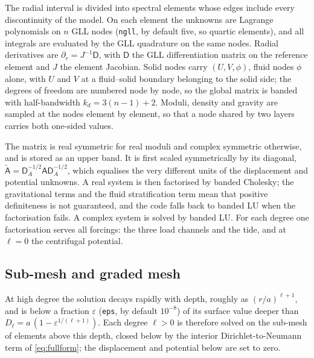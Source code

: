 \documentclass[11pt,a4paper]{article}
\newcommand{\code}[1]{\texttt{#1}}
\numberwithin{equation}{section}
\begin{document}
The radial interval is divided into spectral elements whose edges include every
discontinuity of the model. On each element the unknowns are Lagrange
polynomials on $n$ GLL nodes (\code{ngll}, by default five, so quartic
elements), and all integrals are evaluated by the GLL quadrature on the same
nodes. Radial derivatives are $\partial_{r}=J^{-1}\mathsf{D}$, with
$\mathsf{D}$ the GLL differentiation matrix on the reference element and $J$
the element Jacobian. Solid nodes carry $(U,V,\phi)$, fluid nodes $\phi$ alone,
with $U$ and $V$ at a fluid--solid boundary belonging to the solid side; the
degrees of freedom are numbered node by node, so the global matrix is banded
with half-bandwidth $k_{d}=3(n-1)+2$. Moduli, density and gravity are sampled
at the nodes element by element, so that a node shared by two layers carries
both one-sided values.

The matrix is real symmetric for real moduli and complex symmetric otherwise,
and is stored as an upper band. It is first scaled symmetrically by its
diagonal, $\tilde{\mathsf A}=\mathsf{D}_{A}^{-1/2}\mathsf{A}\mathsf{D}_{A}^{-1/2}$,
which equalises the very different units of the displacement and potential
unknowns. A real system is then factorised by banded Cholesky; the gravitational
terms and the fluid stratification term mean that positive definiteness is not
guaranteed, and the code falls back to banded LU when the factorisation fails.
A complex system is solved by banded LU. For each degree one factorisation
serves all forcings: the three load channels and the tide, and at $\ell=0$ the
centrifugal potential.

\subsection{Sub-mesh and graded mesh}
\label{sec:submesh}

At high degree the solution decays rapidly with depth, roughly as
$(r/a)^{\ell+1}$, and is below a fraction $\varepsilon$ (\code{eps}, by default
$10^{-8}$) of its surface value deeper than
$D_{\ell}=a\,(1-\varepsilon^{1/(\ell+1)})$. Each degree $\ell>0$ is therefore
solved on the sub-mesh of elements above this depth, closed below by the
interior Dirichlet-to-Neumann term of \eqref{eq:fullform}; the displacement and
potential below are set to zero.
\end{document}

